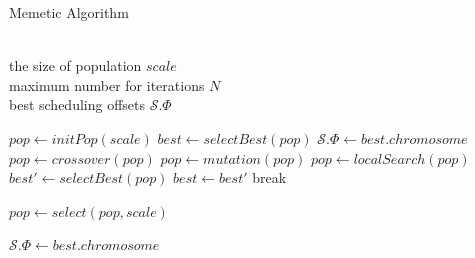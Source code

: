 \documentclass[journal]{IEEEtran}
\newcommand{\calS}{\mathcal{S}}
\theoremstyle{remark}
\begin{document}

\begin{algorithm}[tb]
\caption{Memetic Algorithm}
\renewcommand{\algorithmicrequire}{\textbf{Input:}}
\renewcommand{\algorithmicensure}{\textbf{Output:}}
\begin{algorithmic}[1]
  \REQUIRE~~\\
  the size of population $scale$\\
  maximum number for iterations $N$
  \ENSURE~~\\
  best scheduling offsets $\calS.\Phi$
  
  \STATE $pop \gets initPop(scale)$
  \STATE $best \gets selectBest(pop)$
    \RETURN $\calS.\Phi \gets best.chromosome$
  \ENDIF
    \STATE $pop \gets crossover(pop)$
    \STATE $pop \gets mutation(pop)$
    \STATE $pop \gets localSearch(pop)$
    \STATE $best' \gets selectBest(pop)$
      \STATE $best \gets best'$
    \ENDIF    
      \STATE break
    \ENDIF

    \STATE $pop \gets select(pop, scale)$
  \ENDFOR

  \RETURN $\calS.\Phi \gets best.chromosome$
\end{algorithmic}
\end{algorithm}	
\end{document}
